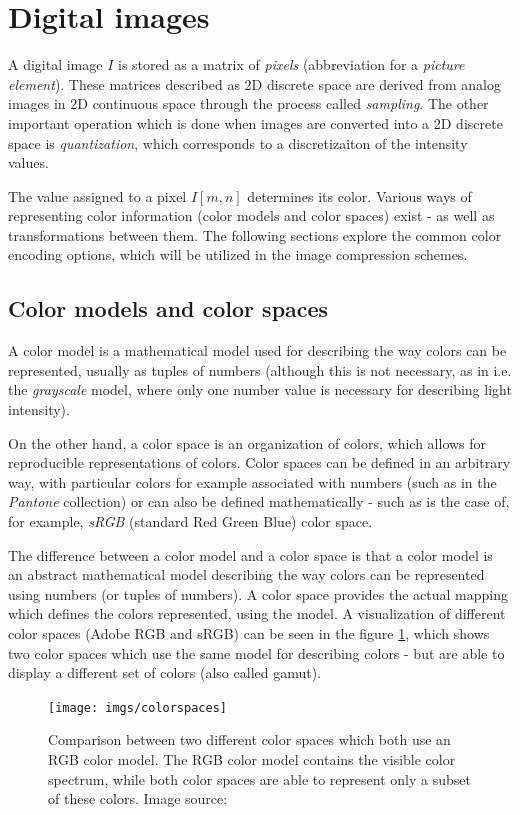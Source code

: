 \documentclass[thesis=M,english]{FITthesis}[2012/10/20]
\begin{document}
\section{Digital images}
A digital image $I$ is stored as a matrix of \emph{pixels} (abbreviation for a \emph{picture
element}). These matrices described as 2D discrete space are derived from analog
images in 2D continuous space through the process called \emph{sampling}. The other important
operation which is done when images are converted into a 2D discrete space is \emph{quantization},
which corresponds to a discretizaiton of the intensity values.

The value assigned to a pixel $I[m,n]$ determines its color. Various ways of representing
color information (color models and color spaces) exist - as well as transformations between
them. The following sections explore the common color encoding options, which will be
utilized in the image compression schemes.

\subsection{Color models and color spaces}
A color model is a mathematical model used for describing the way colors can be represented,
usually as tuples of numbers (although this is not necessary, as in i.e.
the \emph{grayscale} model, where only one number value is necessary for describing light intensity).

On the other hand, a color space is an organization of colors, which allows for reproducible
representations of colors. Color spaces can be defined in an arbitrary way, with particular
colors for example associated with numbers (such as in the \emph{Pantone} collection) or
can also be defined mathematically - such as is the case of, for example, \emph{sRGB} (standard
Red Green Blue) color space.

The difference between a color model and a color space is that a color model is an abstract
mathematical model describing the way colors can be represented using numbers (or tuples of numbers).
A color space provides the actual mapping which defines the colors represented, using the model.
A visualization of different color spaces (Adobe RGB and sRGB) can be seen in the figure \ref{fig:colorspaces},
which shows two color spaces which use the same model for describing colors - but are able to
display a different set of colors (also called gamut).\cite{colormodels}

\begin{figure}[h]
  \centering
  \texttt{[image: imgs/colorspaces]}
  \caption[Comparison between two different color spaces using an RGB model]{Comparison
  		  between two different color spaces which both use an RGB color model. The
  		  RGB color model contains the visible color spectrum, while both color
  		  spaces are able to represent only a subset of these colors. Image source: \cite{wiki_colorspace}}
  \label{fig:colorspaces}
\end{figure}
\end{document}
